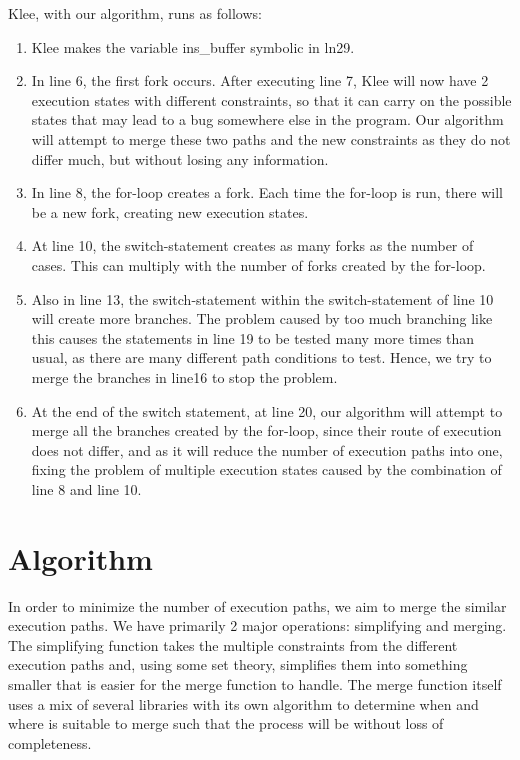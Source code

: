 \documentclass[12pt,a4paper]{article}
\begin{document}
Klee, with our algorithm, runs as follows:
\begin{enumerate}
\item Klee makes the variable ins\_buffer symbolic in ln29. 
\item In line 6, the first fork occurs. After executing line 7, Klee will now have 2 execution states with different constraints, so that it can carry on the possible states that may lead to a bug somewhere else in the program. Our algorithm will attempt to merge these two paths and the new constraints as they do not differ much, but without losing any information.
\item In line 8, the for-loop creates a fork. Each time the for-loop is run, there will be a new fork, creating new execution states. 
\item At line 10, the switch-statement creates as many forks as the number of cases. This can multiply with the number of forks created by the for-loop.
\item Also in line 13, the switch-statement within the switch-statement of line 10 will create more branches. The problem caused by too much branching like this causes the statements in line 19 to be tested many more times than usual, as there are many different path conditions to test. Hence, we try to merge the branches in line16 to stop the problem.
\item At the end of the switch statement, at line 20, our algorithm will attempt to merge all the branches created by the for-loop, since their route of execution does not differ, and as it will reduce the number of execution paths into one, fixing the problem of multiple execution states caused by the combination of line 8 and line 10.
\end{enumerate}

\section{Algorithm}\label{algorithm}
In order to minimize the number of execution paths, we aim to merge the similar execution paths. We have primarily 2 major operations: simplifying and merging. The simplifying function takes the multiple constraints from the different execution paths and, using some set theory, simplifies them into something smaller that is easier for the merge function to handle. The merge function itself uses a mix of several libraries with its own algorithm to determine when and where is suitable to merge such that the process will be without loss of completeness.
\end{document}
